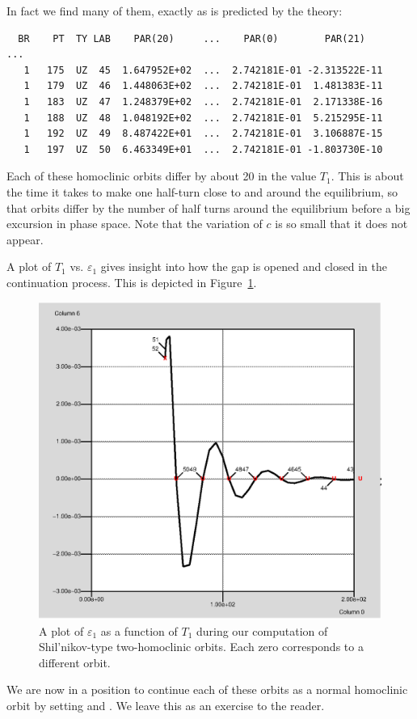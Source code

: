 In fact we find many of them, exactly as is predicted by the theory:
\begin{verbatim}
  BR    PT  TY LAB    PAR(20)     ...    PAR(0)        PAR(21)   
...
   1   175  UZ  45  1.647952E+02  ...  2.742181E-01 -2.313522E-11
   1   179  UZ  46  1.448063E+02  ...  2.742181E-01  1.481383E-11
   1   183  UZ  47  1.248379E+02  ...  2.742181E-01  2.171338E-16
   1   188  UZ  48  1.048192E+02  ...  2.742181E-01  5.215295E-11
   1   192  UZ  49  8.487422E+01  ...  2.742181E-01  3.106887E-15
   1   197  UZ  50  6.463349E+01  ...  2.742181E-01 -1.803730E-10
\end{verbatim}
Each of these homoclinic orbits differ 
by about 20 in the value $T_1$. This is about 
the time it takes to make one half-turn close to and
around the equilibrium, so that orbits differ by the number of 
half turns around the equilibrium before a big excursion
in phase space. Note that the variation of 
$c$ is so small that it does not appear.

A plot of $T_1$ vs. $\varepsilon_1$ gives insight into how the gap
is opened and closed in the continuation process. This is depicted in 
Figure~\ref{shilgap}.
\begin{figure}[htb]
\begin{center}
\includegraphics[scale=0.5]{include/shilgap.eps}
\caption{A plot of $\varepsilon_1$ as a function of $T_1$ 
during our computation of Shil'nikov-type two-homoclinic orbits. 
Each zero corresponds to a different orbit.}
\label{shilgap}
\end{center}
\end{figure}
We are now in a
position to continue each of these orbits as a
normal homoclinic orbit by setting  and
. We leave
this as an exercise to the reader.

